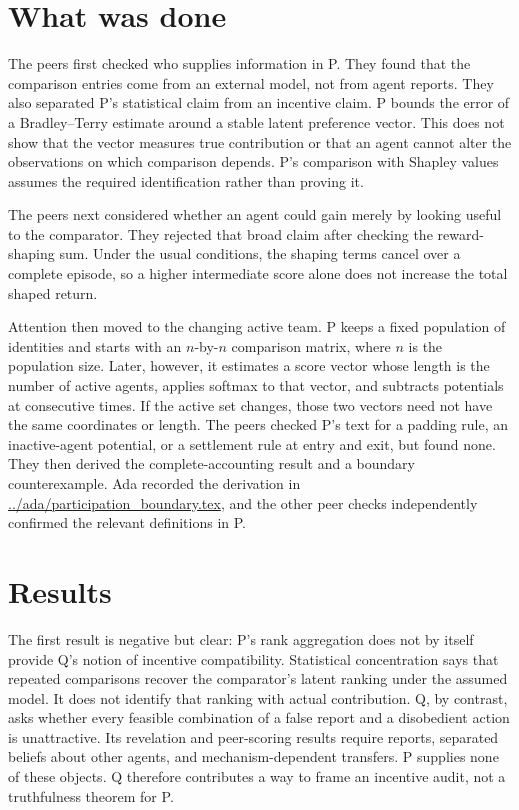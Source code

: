 \documentclass{article}
\begin{document}
\section{What was done}

The peers first checked who supplies information in P.  They found that the comparison entries come from an external model, not from agent reports.  They also separated P's statistical claim from an incentive claim.  P bounds the error of a Bradley--Terry estimate around a stable latent preference vector.  This does not show that the vector measures true contribution or that an agent cannot alter the observations on which comparison depends.  P's comparison with Shapley values assumes the required identification rather than proving it.

The peers next considered whether an agent could gain merely by looking useful to the comparator.  They rejected that broad claim after checking the reward-shaping sum.  Under the usual conditions, the shaping terms cancel over a complete episode, so a higher intermediate score alone does not increase the total shaped return.

Attention then moved to the changing active team.  P keeps a fixed population of identities and starts with an \(n\)-by-\(n\) comparison matrix, where \(n\) is the population size.  Later, however, it estimates a score vector whose length is the number of active agents, applies softmax to that vector, and subtracts potentials at consecutive times.  If the active set changes, those two vectors need not have the same coordinates or length.  The peers checked P's text for a padding rule, an inactive-agent potential, or a settlement rule at entry and exit, but found none.  They then derived the complete-accounting result and a boundary counterexample.  Ada recorded the derivation in \url{../ada/participation_boundary.tex}, and the other peer checks independently confirmed the relevant definitions in P.

\section{Results}

The first result is negative but clear: P's rank aggregation does not by itself provide Q's notion of incentive compatibility.  Statistical concentration says that repeated comparisons recover the comparator's latent ranking under the assumed model.  It does not identify that ranking with actual contribution.  Q, by contrast, asks whether every feasible combination of a false report and a disobedient action is unattractive.  Its revelation and peer-scoring results require reports, separated beliefs about other agents, and mechanism-dependent transfers.  P supplies none of these objects.  Q therefore contributes a way to frame an incentive audit, not a truthfulness theorem for P.
\end{document}

